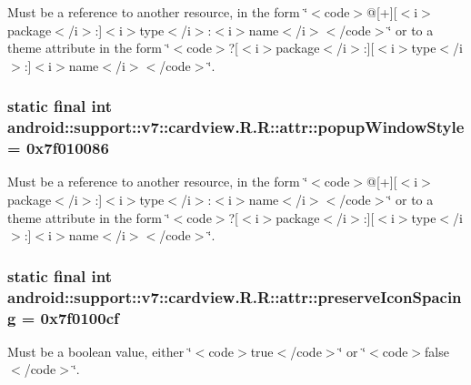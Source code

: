 Must be a reference to another resource, in the form \char`\"{}$<$code$>$@\mbox{[}+\mbox{]}\mbox{[}$<$i$>$package$<$/i$>$:\mbox{]}$<$i$>$type$<$/i$>$:$<$i$>$name$<$/i$>$$<$/code$>$\char`\"{} or to a theme attribute in the form \char`\"{}$<$code$>$?\mbox{[}$<$i$>$package$<$/i$>$:\mbox{]}\mbox{[}$<$i$>$type$<$/i$>$:\mbox{]}$<$i$>$name$<$/i$>$$<$/code$>$\char`\"{}. \hypertarget{classandroid_1_1support_1_1v7_1_1cardview_1_1_r_1_1attr_a59034a2f4fd69fbe5a44126331ad7fd}{
\subsubsection[{popupWindowStyle}]{\setlength{\rightskip}{0pt plus 5cm}static final int android::support::v7::cardview.R.R::attr::popupWindowStyle = 0x7f010086}}
\label{classandroid_1_1support_1_1v7_1_1cardview_1_1_r_1_1attr_a59034a2f4fd69fbe5a44126331ad7fd}


Must be a reference to another resource, in the form \char`\"{}$<$code$>$@\mbox{[}+\mbox{]}\mbox{[}$<$i$>$package$<$/i$>$:\mbox{]}$<$i$>$type$<$/i$>$:$<$i$>$name$<$/i$>$$<$/code$>$\char`\"{} or to a theme attribute in the form \char`\"{}$<$code$>$?\mbox{[}$<$i$>$package$<$/i$>$:\mbox{]}\mbox{[}$<$i$>$type$<$/i$>$:\mbox{]}$<$i$>$name$<$/i$>$$<$/code$>$\char`\"{}. \hypertarget{classandroid_1_1support_1_1v7_1_1cardview_1_1_r_1_1attr_b2cde2b3a494233ce0af55dcbd1e7a47}{
\subsubsection[{preserveIconSpacing}]{\setlength{\rightskip}{0pt plus 5cm}static final int android::support::v7::cardview.R.R::attr::preserveIconSpacing = 0x7f0100cf}}
\label{classandroid_1_1support_1_1v7_1_1cardview_1_1_r_1_1attr_b2cde2b3a494233ce0af55dcbd1e7a47}


Must be a boolean value, either \char`\"{}$<$code$>$true$<$/code$>$\char`\"{} or \char`\"{}$<$code$>$false$<$/code$>$\char`\"{}. 

